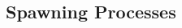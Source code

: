 \documentclass{article}
\begin{document}
\begin{CJK*}{UTF8}{gkai}
\subsection{Spawning Processes}

\begin{lstlisting}[style=ccode, title={\scriptsize \ttfamily \bfseries kern/: ()}]
\end{lstlisting}


\begin{lstlisting}[style=ccode, title={\scriptsize \ttfamily \bfseries kern/: ()}]
\end{lstlisting}

\begin{lstlisting}[style=acode, title={\scriptsize \ttfamily \bfseries kern/: ()}]
\end{lstlisting}

\begin{lstlisting}[style=console]
\end{lstlisting}

\begin{lstlisting}[style=exercise]
\end{lstlisting}

\clearpage

\end{CJK*}
\end{document}
